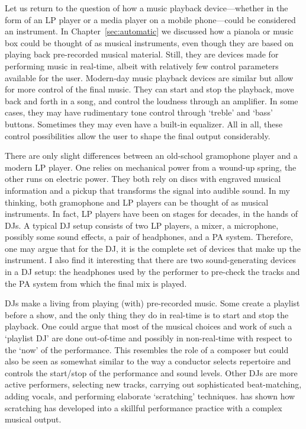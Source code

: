 Let us return to the question of how a music playback device---whether in the form of an LP player or a media player on a mobile phone---could be considered an instrument. In Chapter~\ref{sec:automatic} we discussed how a pianola or music box could be thought of as musical instruments, even though they are based on playing back pre-recorded musical material. Still, they are devices made for performing music in real-time, albeit with relatively few control parameters available for the user. Modern-day music playback devices are similar but allow for more control of the final music. They can start and stop the playback, move back and forth in a song, and control the loudness through an amplifier. In some cases, they may have rudimentary tone control through `treble' and `bass' buttons. Sometimes they may even have a built-in equalizer. All in all, these control possibilities allow the user to shape the final output considerably.

There are only slight differences between an old-school gramophone player and a modern LP player. One relies on mechanical power from a wound-up spring, the other runs on electric power. They both rely on discs with engraved musical information and a pickup that transforms the signal into audible sound. In my thinking, both gramophone and LP players can be thought of as musical instruments. In fact, LP players have been on stages for decades, in the hands of DJs. A typical DJ setup consists of two LP players, a mixer, a microphone, possibly some sound effects, a pair of headphones, and a PA system. Therefore, one may argue that for the DJ, it is the complete set of devices that make up the instrument. I also find it interesting that there are two sound-generating devices in a DJ setup: the headphones used by the performer to pre-check the tracks and the PA system from which the final mix is played.

DJs make a living from playing (with) pre-recorded music. Some create a playlist before a show, and the only thing they do in real-time is to start and stop the playback. One could argue that most of the musical choices and work of such a `playlist DJ' are done out-of-time and possibly in non-real-time with respect to the `now' of the performance. This resembles the role of a composer but could also be seen as somewhat similar to the way a conductor selects repertoire and controls the start/stop of the performance and sound levels. Other DJs are more active performers, selecting new tracks, carrying out sophisticated beat-matching, adding vocals, and performing elaborate `scratching' techniques. \citet{hansen_acoustics_2010} has shown how scratching has developed into a skillful performance practice with a complex musical output.

